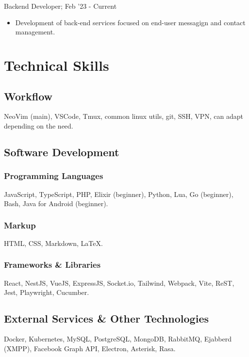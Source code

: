 \documentclass[letterpaper]{article}
\begin{document}
Backend Developer; Feb '23 - Current

\begin{itemize}
  \item Development of back-end services focused on end-user messagign and contact management.
\end{itemize}

\section{Technical Skills}

\subsection{Workflow}

NeoVim (main), VSCode, Tmux, common linux utils, git, SSH, VPN, can adapt depending on the need.

\subsection{Software Development}

\subsubsection{Programming Languages}

JavaScript, TypeScript, PHP, Elixir (beginner), Python, Lua, Go (beginner), Bash, Java for Android (beginner).

\subsubsection{Markup}

HTML, CSS, Markdown, \LaTeX{}.

\subsubsection{Frameworks \& Libraries}

React, NestJS, VueJS, ExpressJS, Socket.io, Tailwind, Webpack, Vite, ReST, Jest, Playwright, Cucumber.

\subsection{External Services \& Other Technologies}

Docker, Kubernetes, MySQL, PostgreSQL, MongoDB, RabbitMQ, Ejabberd (XMPP), Facebook Graph API, Electron, Asterisk, Rasa.
\end{document}
